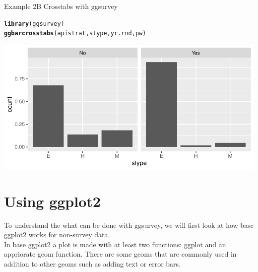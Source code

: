 \documentclass{beamer}\usepackage[]{graphicx}\usepackage[]{color}
\makeatletter
\newcommand{\hlstd}[1]{\textcolor[rgb]{0.345,0.345,0.345}{#1}}%
\newcommand{\hlkwd}[1]{\textcolor[rgb]{0.737,0.353,0.396}{\textbf{#1}}}%
\newenvironment{kframe}{%
 \def\at@end@of@kframe{}%
 \ifinner\ifhmode%
  \def\at@end@of@kframe{\end{minipage}}%
  \begin{minipage}{\columnwidth}%
 \fi\fi%
 \def\FrameCommand##1{\hskip\@totalleftmargin \hskip-\fboxsep
 \colorbox{shadecolor}{##1}\hskip-\fboxsep
     \hskip-\linewidth \hskip-\@totalleftmargin \hskip\columnwidth}%
 \MakeFramed {\advance\hsize-\width
   \@totalleftmargin\z@ \linewidth\hsize
   \@setminipage}}%
 {\par\unskip\endMakeFramed%
 \at@end@of@kframe}
\newenvironment{knitrout}{}{} %
\makeatother
\begin{document}
\begin{frame}[fragile]{Example 2B Crosstabs with ggsurvey}
\begin{knitrout}
\color{fgcolor}\begin{kframe}
\begin{alltt}
\hlkwd{library}\hlstd{(ggsurvey)}
\hlkwd{ggbarcrosstabs}\hlstd{(apistrat, stype, yr.rnd, pw)}
\end{alltt}
\end{kframe}
\includegraphics[width=0.95\linewidth]{figure/unnamed-chunk-7-1} 
\end{knitrout}

\end{frame}
\section{Using ggplot2}
\begin{frame}
To understand the what can be done with ggsurvey, we will first look at how base ggplot2 works for non-survey data.\\
In base ggplot2 a plot is made with at least two functions: ggplot and an appriorate geom function.  There are some geoms that are commonly used in addition to other geoms such as adding text or error bars.
\end{frame}
\end{document}
